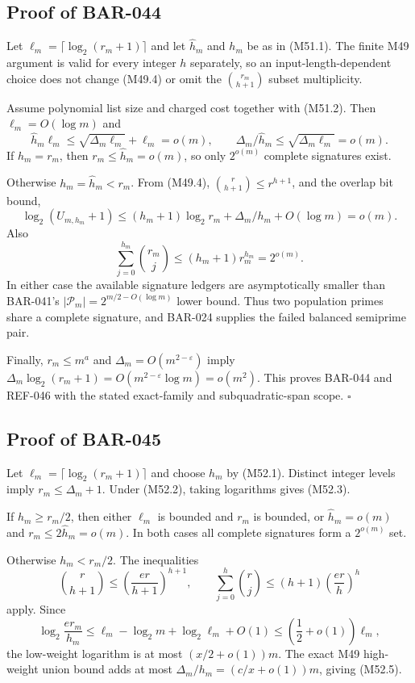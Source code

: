 \documentclass[11pt]{article}
\begin{document}
\subsection{Proof of BAR-044}
\label{proof:BAR-044}

Let
\(\ell_m=\lceil\log_2(r_m+1)\rceil\) and let
\(\widehat h_m\) and \(h_m\) be as in (M51.1). The finite M49 argument is
valid for every integer \(h\) separately, so an input-length-dependent
choice does not change (M49.4) or omit the
\(\binom{r_m}{h+1}\) subset multiplicity.

Assume polynomial list size and charged cost together with (M51.2).
Then \(\ell_m=O(\log m)\) and
\[
\widehat h_m\ell_m
\le
\sqrt{\Delta_m\ell_m}+\ell_m=o(m),
\qquad
\Delta_m/\widehat h_m
\le\sqrt{\Delta_m\ell_m}=o(m).
\]
If \(h_m=r_m\), then \(r_m\le\widehat h_m=o(m)\), so only
\(2^{o(m)}\) complete signatures exist.

Otherwise \(h_m=\widehat h_m<r_m\). From (M49.4),
\(\binom{r}{h+1}\le r^{h+1}\), and the overlap bit bound,
\[
\log_2(U_{m,h_m}+1)
\le
(h_m+1)\log_2r_m+\Delta_m/h_m+O(\log m)=o(m).
\]
Also
\[
\sum_{j=0}^{h_m}\binom{r_m}{j}
\le(h_m+1)r_m^{h_m}=2^{o(m)}.
\]
In either case the available signature ledgers are asymptotically smaller
than BAR-041's
\(|\mathcal P_m|=2^{m/2-O(\log m)}\) lower bound. Thus two population
primes share a complete signature, and BAR-024 supplies the failed balanced
semiprime pair.

Finally, \(r_m\le m^a\) and
\(\Delta_m=O(m^{2-\varepsilon})\) imply
\(\Delta_m\log_2(r_m+1)=O(m^{2-\varepsilon}\log m)=o(m^2)\).
This proves BAR-044 and REF-046 with the stated exact-family and
subquadratic-span scope. \(\square\)

\subsection{Proof of BAR-045}
\label{proof:BAR-045}

Let \(\ell_m=\lceil\log_2(r_m+1)\rceil\) and choose \(h_m\) by
(M52.1). Distinct integer levels imply \(r_m\le\Delta_m+1\). Under
(M52.2), taking logarithms gives (M52.3).

If \(h_m\ge r_m/2\), then either \(\ell_m\) is bounded and \(r_m\) is
bounded, or \(\widehat h_m=o(m)\) and \(r_m\le2\widehat h_m=o(m)\).
In both cases all complete signatures form a \(2^{o(m)}\) set.

Otherwise \(h_m<r_m/2\). The inequalities
\[
\binom{r}{h+1}\le
\left(\frac{er}{h+1}\right)^{h+1},
\qquad
\sum_{j=0}^{h}\binom{r}{j}
\le(h+1)\left(\frac{er}{h}\right)^h
\]
apply. Since
\[
\log_2\frac{er_m}{h_m}
\le\ell_m-\log_2m+\log_2\ell_m+O(1)
\le\left(\frac12+o(1)\right)\ell_m,
\]
the low-weight logarithm is at most \((x/2+o(1))m\). The exact M49
high-weight union bound adds at most
\(\Delta_m/h_m=(c/x+o(1))m\), giving (M52.5).
\end{document}
